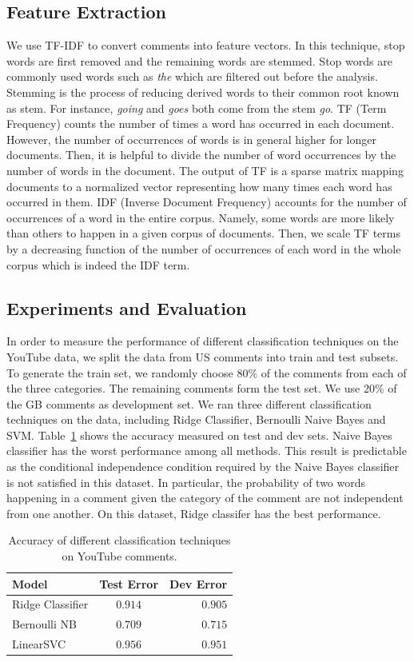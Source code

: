 \subsection{Feature Extraction}
\label{sec:feature}
We use TF-IDF to convert comments into feature vectors. In this technique, stop words are first removed and the remaining words are stemmed. Stop words are commonly used words such as \textit{the} which are filtered out before the analysis. Stemming is the process of reducing derived words to their common root known as stem. For instance, \textit{going} and \textit{goes} both come from the stem \textit{go}. TF (Term Frequency) counts the number of times a word has occurred in each document. However, the number of occurrences of words is in general higher for longer documents. Then, it is helpful to divide the number of word occurrences by the number of words in the document. The output of TF is a sparse matrix mapping documents to a normalized vector representing how many times each word has occurred in them. IDF (Inverse Document Frequency) accounts for the number of occurrences of a word in the entire corpus. Namely, some words are more likely than others to happen in a given corpus of documents. Then, we scale TF terms by a decreasing function of the number of occurrences of each word in the whole corpus which is indeed the IDF term.

\subsection{Experiments and Evaluation}
\label{sec:experiments}
In order to measure the performance of different classification techniques on the YouTube data, we split the data from US comments into train and test subsets. To generate the train set, we randomly choose $80\%$ of the comments from each of the three categories. The remaining comments form the test set. We use $20\%$ of the GB comments as development set. 
We ran three different classification techniques on the data, including Ridge Classifier, Bernoulli Naive Bayes and SVM. Table~\ref{tab:accuracy} shows the accuracy measured on test and dev sets. Naive Bayes classifier has the worst performance among all methods. This result is predictable as the conditional independence condition required by the Naive Bayes classifier is not satisfied in this dataset. In particular, the probability of two words happening in a comment given the category of the comment are not independent from one another. On this dataset, Ridge classifer has the best performance.

\begin{table}%
\centering
\begin{tabular}{|l|c|r|}
\hline
Model & Test Error & Dev Error \\
\hline
Ridge Classifier & $0.914$ & $0.905$ \\
\hline
Bernoulli NB & $0.709$ & $0.715$ \\
\hline
LinearSVC & $0.956$ & $0.951$ \\
\hline
\end{tabular}
\caption{Accuracy of different classification techniques on YouTube comments.}
\label{tab:accuracy}
\end{table}